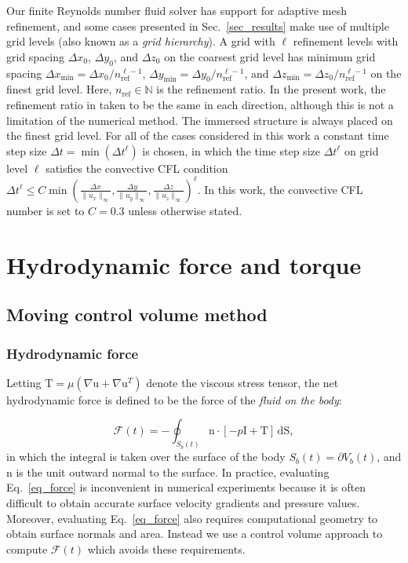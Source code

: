 \documentclass[review]{elsarticle}
\renewcommand{\vec}[1]{\bm{\mathrm{#1}}}
\def \grad{\nabla}
\def \n{\vec{n}}
\def \u{\vec{u}}
\def \I{\vec{I}}
\def \T{\vec{T}}
\def \Sbt{S_b(t)}
\def \Vbt{V_b(t)}
\def \cF{\vec{\mathcal{F}}}
\def \I{\vec{I}}
\def \n{\vec{n}}
\def \nref{n_{\text{ref}}}
\def \u{\vec{u}}
\def \grad{\nabla}
\def \dt{\Delta t}
\def \dx{\Delta x}
\def \dy{\Delta y}
\def \dz{\Delta z}
\def \dS{\,\mathrm{dS}}
\def \dt{\Delta t}
\def \dx{\Delta x}
\def \ndot{\n \cdot}
\newcommand{\REVIEW}[1]{{#1}}
\begin{document}
Our finite Reynolds number fluid solver has support for adaptive mesh refinement, and some cases presented in 
Sec.~\ref{sec_results} make use of multiple grid levels (also known as a \emph{grid hierarchy}).
A grid with $\ell$ refinement levels with grid spacing $\dx_0$, $\dy_0$, and $\dz_0$ on the coarsest grid level
has minimum grid spacing $\dx_\textrm{min} = \dx_0/\nref^{\ell-1}$, 
$\dy_\textrm{min} = \dy_0/\nref^{\ell-1}$, and $\dz_\textrm{min} = \dz_0/\nref^{\ell-1}$ on the finest grid level.
Here, $\nref \in \mathbb{N}$ is the refinement ratio.
In the present work, the refinement ratio in taken to be the same in each direction, although
this is not a limitation of the numerical method. The immersed structure is always placed
on the finest grid level. \REVIEW{For all of the cases considered in this work a constant time step size 
$\dt = \min(\dt^{\ell})$ is chosen, in which the time step size $\dt^{\ell}$ on grid level $\ell$ satisfies 
the convective CFL condition 
$\dt^{\ell} \le C \min \left(\frac{\dx}{\|u_x\|_{\infty}}, \frac{\dy}{\|u_y\|_{\infty}}, \frac{\dz}{\|u_z\|_{\infty}}\right)^{\ell}$. 
In this work, the convective CFL number is set to $C = 0.3$ unless otherwise stated.}


\section{Hydrodynamic force and torque}
\subsection{Moving control volume method}

\subsubsection{Hydrodynamic force}
Letting $\T = \mu\left(\grad \u + \grad \u^T\right)$ denote the
viscous stress tensor, the net hydrodynamic force is defined to be
the force of the \emph{fluid on the body}:

\begin{equation}
\cF(t) = -\oint_{\Sbt} \ndot \left[-p \I + \T\right] \dS,  \label{eq_force}
\end{equation}
in which the integral is taken over the surface of the body $\Sbt = 
\partial \Vbt$, and $\n$ is the unit outward normal to the surface. In practice, 
evaluating Eq.~\eqref{eq_force} is inconvenient in numerical experiments 
because it is often difficult to obtain accurate surface velocity gradients and 
pressure values. Moreover, evaluating Eq.~\eqref{eq_force} also requires computational 
geometry to obtain surface normals and area. Instead we use a control volume 
approach to compute $\cF(t)$ which avoids these requirements. 
\end{document}
